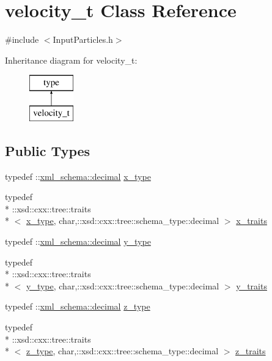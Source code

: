 \hypertarget{classvelocity__t}{\section{velocity\-\_\-t Class Reference}
\label{classvelocity__t}
}


{\ttfamily \#include $<$Input\-Particles.\-h$>$}

Inheritance diagram for velocity\-\_\-t\-:\begin{figure}[H]
\begin{center}
\leavevmode
\includegraphics[height=2.000000cm]{classvelocity__t}
\end{center}
\end{figure}
\subsection*{Public Types}
\begin{DoxyCompactItemize}
\item 
typedef \-::\hyperlink{namespacexml__schema_a69bfaf24f63a8c18ebd8e21db6b343df}{xml\-\_\-schema\-::decimal} \hyperlink{classvelocity__t_a96ff8f29edf435cfe0966409d22b33c7}{x\-\_\-type}
\item 
typedef \\*
\-::xsd\-::cxx\-::tree\-::traits\\*
$<$ \hyperlink{classvelocity__t_a96ff8f29edf435cfe0966409d22b33c7}{x\-\_\-type}, char,\-::xsd\-::cxx\-::tree\-::schema\-\_\-type\-::decimal $>$ \hyperlink{classvelocity__t_a2fed2e212062cdd498a218d3c0ac8308}{x\-\_\-traits}
\item 
typedef \-::\hyperlink{namespacexml__schema_a69bfaf24f63a8c18ebd8e21db6b343df}{xml\-\_\-schema\-::decimal} \hyperlink{classvelocity__t_aab88921abbd89667cc4d293a448877f3}{y\-\_\-type}
\item 
typedef \\*
\-::xsd\-::cxx\-::tree\-::traits\\*
$<$ \hyperlink{classvelocity__t_aab88921abbd89667cc4d293a448877f3}{y\-\_\-type}, char,\-::xsd\-::cxx\-::tree\-::schema\-\_\-type\-::decimal $>$ \hyperlink{classvelocity__t_a315747a86c40ace5db31652413ae56a2}{y\-\_\-traits}
\item 
typedef \-::\hyperlink{namespacexml__schema_a69bfaf24f63a8c18ebd8e21db6b343df}{xml\-\_\-schema\-::decimal} \hyperlink{classvelocity__t_a0268003d7669eaa63abdcd4df2933316}{z\-\_\-type}
\item 
typedef \\*
\-::xsd\-::cxx\-::tree\-::traits\\*
$<$ \hyperlink{classvelocity__t_a0268003d7669eaa63abdcd4df2933316}{z\-\_\-type}, char,\-::xsd\-::cxx\-::tree\-::schema\-\_\-type\-::decimal $>$ \hyperlink{classvelocity__t_a7231515c9a7c3d2bbab96bccc8b12c6e}{z\-\_\-traits}
\end{DoxyCompactItemize}
